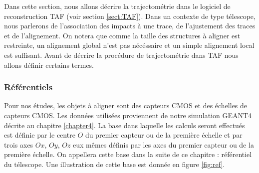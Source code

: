    Dans cette section, nous allons d\'ecrire la trajectom\'etrie dans le logiciel de reconstruction TAF (voir section \ref{sect:TAF}). Dans un contexte de type t\'elescope, nous parlerons de l'association des impacts \`a une trace, de l'ajustement des traces et de l'alignement. On notera que comme la taille des structures \`a aligner est restreinte, un alignement global n'est pas n\'ec\'essaire et un simple alignement local est suffisant. Avant de d\'ecrire la proc\'edure de trajectom\'etrie dans TAF nous allons d\'efinir certains termes.

% 
%   
%   
%   
% 
   
   \subsubsection{R\'ef\'erentiels}

   Pour nos \'etudes, les objets \`a aligner sont des capteurs CMOS et des \'echelles de capteurs CMOS. Les donn\'ees utilis\'ees proviennent de notre simulation GEANT4 d\'ecrite au chapitre \ref{chapter4}. La base dans laquelle les calculs seront effectu\'es est d\'efinie par le centre $O$ du premier capteur ou de la premi\`ere \'echelle et par trois axes $Ox$, $Oy$, $Oz$ eux m\^emes d\'efinis par les axes du premier capteur ou de la premi\`ere \'echelle. On appellera cette base dans la suite de ce chapitre : r\'ef\'erentiel du t\'elescope. Une illustration de cette base est donn\'ee en figure \ref{fig:ref}.

